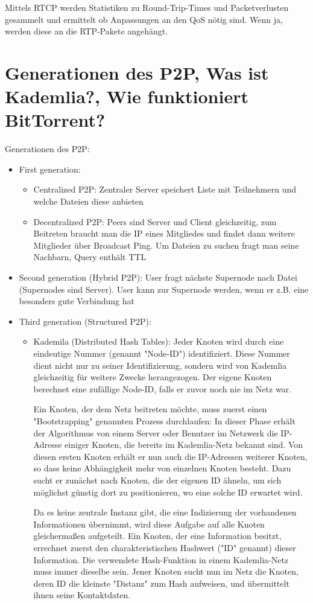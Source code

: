 \documentclass{article}
\begin{document}
	Mittels RTCP werden Statistiken zu Round-Trip-Times und Packetverlusten gesammelt und ermittelt ob Anpassungen an den QoS nötig sind. Wenn ja, werden diese an die RTP-Pakete angehängt.
	
	\section*{Generationen des P2P, Was ist Kademlia?, Wie funktioniert BitTorrent?}
	
	Generationen des P2P:
	\begin{itemize}
		\item First generation:
		\begin{itemize}
			\item Centralized P2P: Zentraler Server speichert Liste mit Teilnehmern und welche Dateien diese anbieten
			\item Decentralized P2P: Peers sind Server und Client gleichzeitig, zum Beitreten braucht man die IP eines Mitgliedes und findet dann weitere Mitglieder über Broadcast Ping. Um Dateien zu suchen fragt man seine Nachbarn, Query enthält TTL
		\end{itemize}
		\item Second generation (Hybrid P2P): User fragt nächste Supernode nach Datei (Supernodes sind Server). User kann zur Supernode werden, wenn er z.B. eine besonders gute Verbindung hat
		\item Third generation (Structured P2P):
		\begin{itemize}
			\item Kademila (Distributed Hash Tables): Jeder Knoten wird durch eine eindeutige Nummer (genannt "Node-ID") identifiziert. Diese Nummer dient nicht nur zu seiner Identifizierung, sondern wird von Kademlia gleichzeitig für weitere Zwecke herangezogen. Der eigene Knoten berechnet eine zufällige Node-ID, falls er zuvor noch nie im Netz war.
			
			Ein Knoten, der dem Netz beitreten möchte, muss zuerst einen "Bootstrapping" genannten Prozess durchlaufen: In dieser Phase erhält der Algorithmus von einem Server oder Benutzer im Netzwerk die IP-Adresse einiger Knoten, die bereits im Kademlia-Netz bekannt sind. Von diesen ersten Knoten erhält er nun auch die IP-Adressen weiterer Knoten, so dass keine Abhängigkeit mehr von einzelnen Knoten besteht. Dazu sucht er zunächst nach Knoten, die der eigenen ID ähneln, um sich möglichst günstig dort zu positionieren, wo eine solche ID erwartet wird.
			
			Da es keine zentrale Instanz gibt, die eine Indizierung der vorhandenen Informationen übernimmt, wird diese Aufgabe auf alle Knoten gleichermaßen aufgeteilt. Ein Knoten, der eine Information besitzt, errechnet zuerst den charakteristischen Hashwert ("ID" genannt) dieser Information. Die verwendete Hash-Funktion in einem Kademlia-Netz muss immer dieselbe sein. Jener Knoten sucht nun im Netz die Knoten, deren ID die kleinste "Distanz" zum Hash aufweisen, und übermittelt ihnen seine Kontaktdaten.
			

\end{itemize}
\end{itemize}
\end{document}

